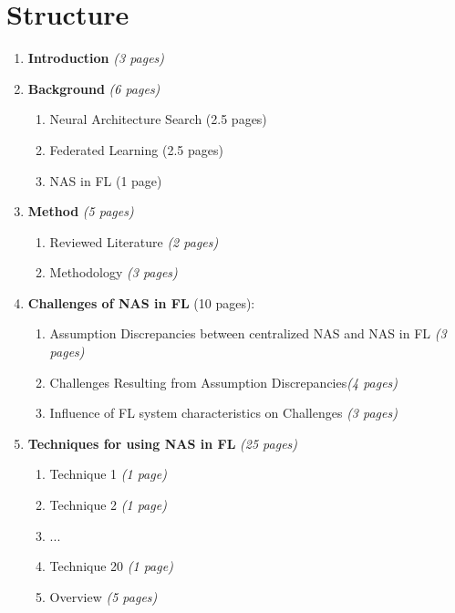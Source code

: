 \section{Structure}

\begin{enumerate}
    \item \textbf{Introduction} \textit{(3 pages)}
    
    \item \textbf{Background} \textit{(6 pages)}
    
    \begin{enumerate}
        \item Neural Architecture Search (2.5 pages) 

        \item Federated Learning (2.5 pages) 

        \item NAS in FL (1 page) 
        
    \end{enumerate}
    
    \item \textbf{Method} \textit{(5 pages)}
    \begin{enumerate}
        \item Reviewed Literature \textit{(2 pages)} 
        \item Methodology \textit{(3 pages)}
    \end{enumerate}

    \item \textbf{Challenges of NAS in FL} (10 pages): 
    \begin{enumerate}

        \item Assumption Discrepancies between centralized NAS and NAS in FL \textit{(3 pages)}

        \item Challenges Resulting from Assumption Discrepancies\textit{(4 pages)}

        \item Influence of FL system characteristics on Challenges \textit{(3 pages)}
    \end{enumerate}
    
	\item \textbf{Techniques for using NAS in FL} \textit{(25 pages)} 

    \begin{enumerate}
        \item Technique 1 \textit{(1 page)} 
        \item Technique 2 \textit{(1 page)}
        \item ...
        \item Technique 20 \textit{(1 page)}
        \item Overview \textit{(5 pages)} 
    \end{enumerate}


\end{enumerate}
